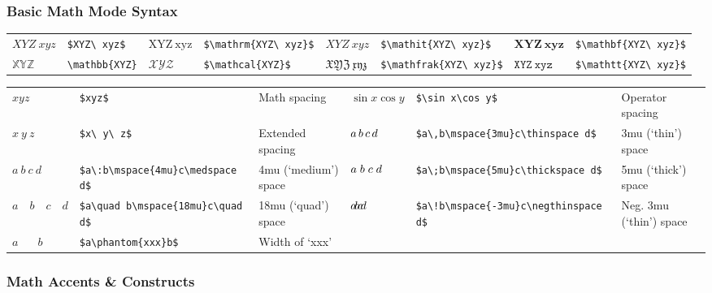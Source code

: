 \documentclass[10pt, english]{article}
\begin{document}
\subsubsection*{Basic Math Mode Syntax}

	\begin{center}
		\scriptsize
	\begin{tabular}{ll|ll|ll|ll}
		$XYZ\ xyz$ & \verb|$XYZ\ xyz$| & $\mathrm{XYZ\ xyz}$ & \verb|$\mathrm{XYZ\ xyz}$| & $\mathit{XYZ\ xyz}$ & \verb|$\mathit{XYZ\ xyz}$| & $\mathbf{XYZ\ xyz}$ & \verb|$\mathbf{XYZ\ xyz}$|\\
		$\mathbb{XYZ}$ & \verb|\mathbb{XYZ}| & $\mathcal{XYZ}$ & \verb|$\mathcal{XYZ}$| & $\mathfrak{XYZ\ xyz}$ & \verb|$\mathfrak{XYZ\ xyz}$| & $\mathtt{XYZ\ xyz}$ & \verb|$\mathtt{XYZ\ xyz}$|\\
	\end{tabular}
	\end{center}

	\begin{center}
		\scriptsize
	\begin{tabular}{lll|lll}
		$xyz$ & \verb|$xyz$| & Math spacing & $\sin x\cos y$ & \verb|$\sin x\cos y$| & Operator spacing\\
		$x\ y\ z$ & \verb|$x\ y\ z$| & Extended spacing & $a\,b\mspace{3mu}c\thinspace d$ & \verb|$a\,b\mspace{3mu}c\thinspace d$| & 3mu (`thin') space\\
		$a\:b\mspace{4mu}c\medspace d$ & \verb|$a\:b\mspace{4mu}c\medspace d$| & 4mu (`medium') space & $a\;b\mspace{5mu}c\thickspace d$ & \verb|$a\;b\mspace{5mu}c\thickspace d$| & 5mu (`thick') space\\
		$a\quad b\mspace{18mu}c\quad d$ & \verb|$a\quad b\mspace{18mu}c\quad d$| & 18mu (`quad') space & $a\!b\mspace{-3mu}c\negthinspace d$ & \verb|$a\!b\mspace{-3mu}c\negthinspace d$| & Neg. 3mu (`thin') space\\
		$a\phantom{xxx}b$ & \verb|$a\phantom{xxx}b$| & Width of `xxx'\\
	\end{tabular}
	\end{center}

\subsubsection*{Math Accents \& Constructs}
\end{document}

